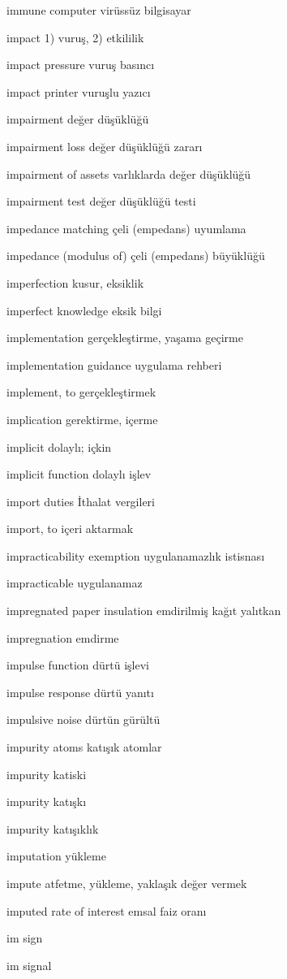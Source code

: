 \documentclass[12pt,fleqn]{article}\usepackage{../../common}
\begin{document}
immune computer virüssüz bilgisayar

impact 1) vuruş, 2) etkililik

impact pressure vuruş basıncı

impact printer vuruşlu yazıcı

impairment değer düşüklüğü

impairment loss değer düşüklüğü zararı

impairment of assets varlıklarda değer düşüklüğü

impairment test değer düşüklüğü testi

impedance matching çeli (empedans) uyumlama

impedance (modulus of) çeli (empedans) büyüklüğü

imperfection kusur, eksiklik

imperfect knowledge eksik bilgi

implementation gerçekleştirme, yaşama geçirme

implementation guidance uygulama rehberi

implement, to gerçekleştirmek

implication gerektirme, içerme

implicit dolaylı; içkin

implicit function dolaylı işlev

import duties İthalat vergileri

import, to içeri aktarmak

impracticability exemption uygulanamazlık istisnası

impracticable uygulanamaz

impregnated paper insulation emdirilmiş kağıt yalıtkan

impregnation emdirme

impulse function dürtü işlevi

impulse response dürtü yanıtı

impulsive noise dürtün gürültü

impurity atoms katışık atomlar

impurity katiski

impurity katışkı

impurity katışıklık

imputation yükleme

impute atfetme, yükleme, yaklaşık değer vermek

imputed rate of interest emsal faiz oranı

im sign

im signal
\end{document}
